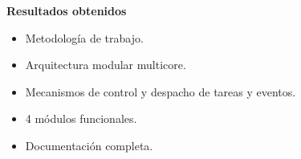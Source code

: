 \documentclass[11pt, xcolor={table,xcdraw}]{beamer}
\begin{document}
\begin{frame}{\textbf{\LARGE{Resultados obtenidos}}}
\fontsize{18pt}{18}\selectfont
	\vspace{-.7cm}
	\centering
	\begin{itemize}
  \item Metodología de trabajo.
	\vspace{15px}
	\item Arquitectura modular multicore.
	\vspace{15px}
	\item Mecanismos de control y despacho de tareas y eventos.
	\vspace{15px}
	\item 4 módulos funcionales.
	\vspace{15px}	
	\item Documentación completa.
	\end{itemize}
\end{frame}
\end{document}
